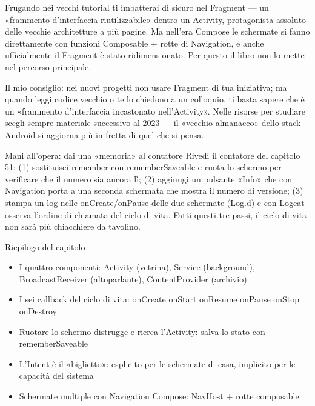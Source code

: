 
Frugando nei vecchi tutorial ti imbatterai di sicuro nel Fragment — un «frammento d'interfaccia riutilizzabile» dentro un Activity, protagonista assoluto delle vecchie architetture a più pagine. Ma nell'era Compose le schermate si fanno direttamente con funzioni Composable + rotte di Navigation, e anche ufficialmente il Fragment è stato ridimensionato. Per questo il libro non lo mette nel percorso principale.

Il mio consiglio: nei nuovi progetti non usare Fragment di tua iniziativa; ma quando leggi codice vecchio o te lo chiedono a un colloquio, ti basta sapere che è un «frammento d'interfaccia incastonato nell'Activity». Nelle risorse per studiare scegli sempre materiale successivo al 2023 — il «vecchio almanacco» dello stack Android si aggiorna più in fretta di quel che si pensa.

\begin{tcbpractice}{Mani all'opera: dai una «memoria» al contatore}
Rivedi il contatore del capitolo 51: (1) sostituisci remember con rememberSaveable e ruota lo schermo per verificare che il numero sia ancora lì; (2) aggiungi un pulsante «Info» che con Navigation porta a una seconda schermata che mostra il numero di versione; (3) stampa un log nelle onCreate/onPause delle due schermate (Log.d) e con Logcat osserva l'ordine di chiamata del ciclo di vita. Fatti questi tre passi, il ciclo di vita non sarà più chiacchiere da tavolino.

\end{tcbpractice}

\begin{tcbsummary}{Riepilogo del capitolo}
\begin{itemize}
  \item I quattro componenti: Activity (vetrina), Service (background), BroadcastReceiver (altoparlante), ContentProvider (archivio)
  \item I sei callback del ciclo di vita: onCreate onStart onResume onPause onStop onDestroy
  \item Ruotare lo schermo distrugge e ricrea l'Activity: salva lo stato con rememberSaveable
  \item L'Intent è il «biglietto»: esplicito per le schermate di casa, implicito per le capacità del sistema
  \item Schermate multiple con Navigation Compose: NavHost + rotte composable
\end{itemize}

\end{tcbsummary}
